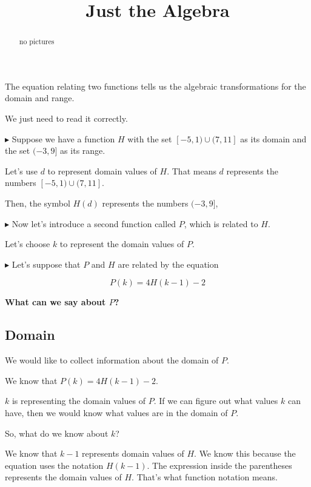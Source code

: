 \documentclass{ximera}
\title{Just the Algebra}
\begin{document}
\begin{abstract}
no pictures
\end{abstract}
\maketitle




The equation relating two functions tells us the algebraic transformations for the domain and range. 

We just need to read it correctly. 



\textbf{\textcolor{blue!55!black}{$\blacktriangleright$}}  Suppose we have a function $H$ with the set $[-5, 1) \cup (7, 11]$ as its domain and the set $(-3, 9]$ as its range. 

Let's use $d$ to represent domain values of $H$.  That means $d$ represents the numbers $[-5, 1) \cup (7, 11]$. 

Then, the symbol $H(d)$ represents the numbers $(-3, 9]$, 


\textbf{\textcolor{blue!55!black}{$\blacktriangleright$}} Now let's introduce a second function called $P$, which is related to $H$. 

Let's choose $k$ to represent the domain values of $P$. 


\textbf{\textcolor{blue!55!black}{$\blacktriangleright$}} Let's suppose that $P$ and $H$ are related by the equation 

\[ 
P(k) = 4 H(k-1) - 2
\]



\textbf{\textcolor{blue!55!black}{What can we say about $P$?}}  



\subsection*{Domain}


We would like to collect information about the domain of $P$. 

We know that $P(k) = 4 H(k-1) - 2$.

$k$ is representing the domain values of $P$.  If we can figure out what values $k$ can have, then we would know what values are in the domain of $P$. 

So, what do we know about $k$? 


We know that $k-1$ represents domain values of $H$.  We know this because the equation uses the notation $H(k-1)$.  The expression inside the parentheses represents the domain values of $H$.  That's what function notation means. 
\end{document}
